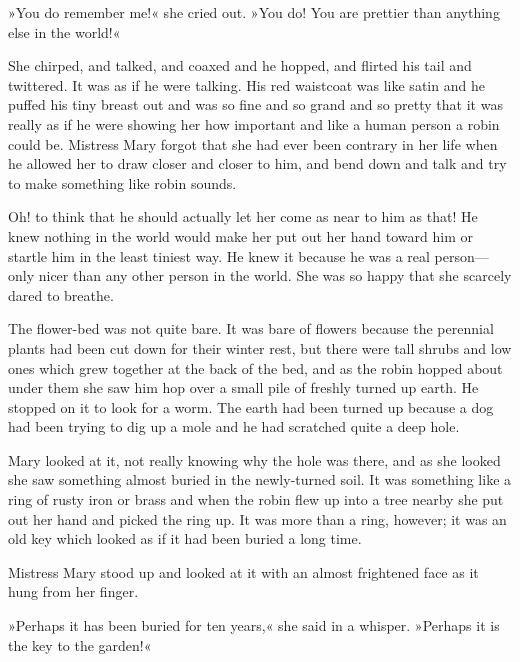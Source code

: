 »You do remember me!« she cried out. »You do! You are prettier than anything else in the world!«

She chirped, and talked, and coaxed and he hopped, and flirted his tail and twittered. It was as if he were talking. His red waistcoat was like satin and he puffed his tiny breast out and was so fine and so grand and so pretty that it was really as if he were showing her how important and like a human person a robin could be. Mistress Mary forgot that she had ever been contrary in her life when he allowed her to draw closer and closer to him, and bend down and talk and try to make something like robin sounds.

Oh! to think that he should actually let her come as near to him as that! He knew nothing in the world would make her put out her hand toward him or startle him in the least tiniest way. He knew it because he was a real person—only nicer than any other person in the world. She was so happy that she scarcely dared to breathe.

The flower-bed was not quite bare. It was bare of flowers because the perennial plants had been cut down for their winter rest, but there were tall shrubs and low ones which grew together at the back of the bed, and as the robin hopped about under them she saw him hop over a small pile of freshly turned up earth. He stopped on it to look for a worm. The earth had been turned up because a dog had been trying to dig up a mole and he had scratched quite a deep hole.

Mary looked at it, not really knowing why the hole was there, and as she looked she saw something almost buried in the newly-turned soil. It was something like a ring of rusty iron or brass and when the robin flew up into a tree nearby she put out her hand and picked the ring up. It was more than a ring, however; it was an old key which looked as if it had been buried a long time.

Mistress Mary stood up and looked at it with an almost frightened face as it hung from her finger.

»Perhaps it has been buried for ten years,« she said in a whisper. »Perhaps it is the key to the garden!«